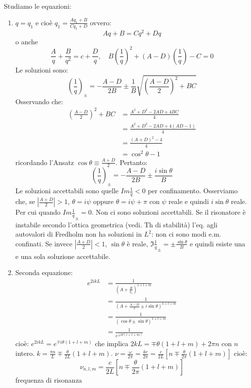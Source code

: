Studiamo le equazioni:
\begin{enumerate}
\item $q=q_1$ e cioè $q_1 = \frac{Aq_1 + B}{Cq_1 + D}$ ovvero:
\begin{equation*}
Aq + B = Cq^2 + Dq
\end{equation*}
o anche
\begin{equation*}
\frac{A}{q} + \frac{B}{q^2} = c +\frac{D}{q}, \quad B\left(\frac{1}{q}\right)^2 + (A-D)\left(\frac{1}{q}\right) -C = 0
\end{equation*}
Le soluzioni sono:
\begin{equation*}
\left(\frac{1}{q}\right)_{\pm} = -\frac{A-D}{2B} \pm \frac{1}{B}\sqrt{\left(\frac{A-D}{2}\right)^2 + BC}
\end{equation*}
Osservando che:
\begin{align*}
\left(\frac{A-D}{2}\right)^2 + BC &= \frac{A^2 +D^2 -2AD + 4BC}{4}\\
&= \frac{A^2 + D^2 - 2AD + 4(AD-1)}{4}\\
&= \frac{(A+D)^2 -4}{4}\\
&= \cos^2\theta -1 
\end{align*}
ricordando l'Ansatz $\cos\theta \equiv \frac{A+D}{2}$.
Pertanto:
\begin{equation*}
\left(\frac{1}{q}\right)_{\pm} = - \frac{A-D}{2B} \pm \frac{i\sin\theta}{B}
\end{equation*}
Le soluzioni accettabili sono quelle $Im{\frac{1}{q}}<0$ per confinamento. Osserviamo che, se $\left|\frac{A+D}{2}\right|>1$, $\theta = i\psi$ oppure $\theta=i\psi +\pi$ con $\psi$ reale e quindi $i\sin\theta$ reale. Per cui quando $Im{\frac{1}{q}}_\pm = 0$. Non ci sono soluzioni accettabili.
Se il risonatore è instabile secondo l'ottica geometrica (vedi. Th di stabilità) l'eq. agli autovalori di Fredholm non ha soluzioni in $L^2$: non ci sono modi e.m. confinati.
Se invece $\left|\frac{A+D}{2}\right|<1$, $\sin\theta$ è reale, $\Im{\frac{1}{q}_\pm}= \pm\frac{\sin\theta}{B}$ e quindi esiste una e una sola soluzione accettabile.
\item Seconda equazione:
\begin{align*}
e^{2ikL} &= \frac{1}{\left(A + \frac{B}{q_1}\right)^{1+l+m}}\\
&= \frac{1}{\left(A + \frac{A-D}{2}\pm i\sin\theta\right)^{1+l+m}}\\
&= \frac{1}{\left(\cos \theta \pm \sin \theta\right)^{1+l+m}}\\
&= \frac{1}{e^{\pm i\theta(i+l+m)}}
\end{align*}
cioè:
$e^{2ikL} = e^{\mp i\theta(1+l+m)}$ che implica $2kL = \mp \theta(1+l+m) + 2\pi n$ con $n$ intero. $k = \frac{\pi n}{L} \mp \frac{\theta}{2L}(1+l+m)$. $\nu = \frac{\omega}{2\pi} = \frac{kc}{2\pi} = \frac{c}{2L} \left[n \mp \frac{\theta}{2\pi}(1+l+m)\right]$
cioè:
\begin{equation*}
\nu_{n,l,m} = \frac{c}{2L} \left[n \mp \frac{\theta}{2\pi}(1+l+m)\right]
\end{equation*}
frequenza di risonanza


\end{enumerate}

